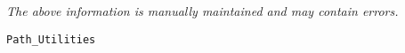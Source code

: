 \label{pkg:path\_utilities}

{\tiny \it The above information is manually maintained and may contain errors.}
\begin{verbatim}
Path_Utilities
\end{verbatim}
